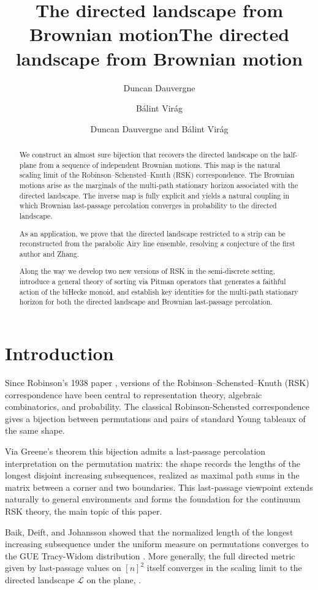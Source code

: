 \documentclass[11pt]{article}
\title{The directed landscape from Brownian motion}
\author{Duncan Dauvergne \and B\'alint Vir\'ag}
\title{The directed landscape from Brownian motion}
\author{Duncan Dauvergne and B\'alint Vir\'ag}
\theoremstyle{definition} %
\theoremstyle{remark} %
\begin{document}
	\maketitle

\begin{abstract}
We construct an almost sure bijection that recovers the directed landscape on the half-plane from a sequence of independent Brownian motions. This map is the natural scaling limit of the Robinson--Schensted--Knuth (RSK) correspondence. The Brownian motions arise as the marginals of the multi-path stationary horizon associated with the directed landscape. The inverse map is fully explicit and yields a natural coupling in which Brownian last-passage percolation converges in probability to the directed landscape.

As an application, we prove that the directed landscape restricted to a strip can be reconstructed from the parabolic Airy line ensemble, resolving a conjecture of the first author and Zhang.

Along the way we develop two new versions of RSK in the semi-discrete setting, introduce a general theory of sorting via Pitman operators that generates a faithful action of the biHecke monoid, and establish key identities for the multi-path stationary horizon for both the directed landscape and Brownian last-passage percolation.
\end{abstract}
	\tableofcontents

\section{Introduction}

Since Robinson's 1938 paper \cite{Robinson1938}, versions of the Robinson--Schensted--Knuth (RSK) correspondence have been central to representation theory, algebraic combinatorics, and probability. The classical Robinson-Schensted correspondence gives a bijection between permutations and pairs of standard Young tableaux of the same shape. 

Via Greene's theorem this bijection admits a last-passage percolation interpretation on the permutation matrix: the shape records the lengths of the longest disjoint increasing subsequences, realized as maximal path sums in the matrix between a corner and two boundaries. This last-passage viewpoint extends naturally to general environments and forms the foundation for the continuum RSK theory, the main topic of this paper.

Baik, Deift, and Johansson showed that the normalized length of the longest increasing subsequence under the uniform measure on permutations converges to the GUE Tracy-Widom distribution \cite{baik1999distribution}. More generally, the full directed metric given by last-passage values on \([n]^2\) itself converges in the scaling limit to the directed landscape \(\mathcal{L}\) on the plane,  \cite{dauvergne2021scaling}.
\end{document}
